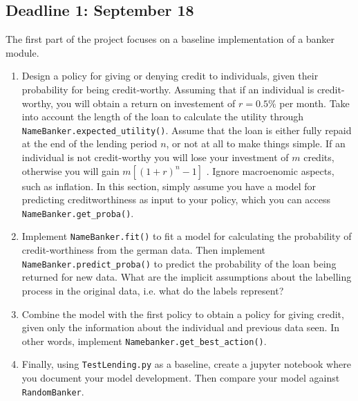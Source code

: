 \subsection{Deadline 1: September 18}
The first part of the project focuses on a baseline implementation of a banker module.
\begin{enumerate}
\item Design a policy for giving or denying credit to individuals, given their probability for being credit-worthy. Assuming that if an individual is credit-worthy, you will obtain a return on investement of $r = 0.5\%$ per month. Take into account the length of the loan to calculate the utility through \verb|NameBanker.expected_utility()|. Assume that the loan is either fully repaid at the end of the lending period $n$, or not at all to make things simple. If an individual is not credit-worthy you will lose your investment of $m$ credits, otherwise you will gain $m [(1 + r)^{n} - 1]$ . Ignore macroenomic aspects, such as inflation. In this section, simply assume you have a model for predicting creditworthiness as input to your policy, which you can access \verb|NameBanker.get_proba()|. 
\item Implement \verb|NameBanker.fit()| to fit a model for calculating the probability of credit-worthiness from the german data. Then implement \verb|NameBanker.predict_proba()| to predict the probability of the loan being returned for new data. What are the implicit assumptions about the labelling process in the original data, i.e. what do the labels represent?
\item Combine the model with the first policy to obtain a policy for giving credit, given only the information about the individual and previous data seen. In other words, implement \verb|Namebanker.get_best_action()|.
\item Finally, using \verb|TestLending.py| as a baseline, create a jupyter notebook where you document your model development. Then compare your model against \verb|RandomBanker|.
\end{enumerate}

